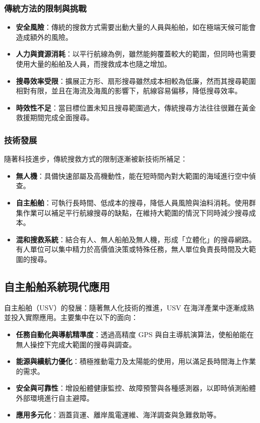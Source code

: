 \documentclass[12pt,a4paper]{ctexart}
\begin{document}
\subsubsection{傳統方法的限制與挑戰}
\begin{itemize}
  \item \textbf{安全風險}：傳統的搜救方式需要出動大量的人員與船舶，如在極端天候可能會造成額外的風險。
  \item \textbf{人力與資源消耗}：以平行航線為例，雖然能夠覆蓋較大的範圍，但同時也需要使用大量的船舶及人員，而搜救成本也隨之增加。
  \item \textbf{搜尋效率受限}：擴展正方形、扇形搜尋雖然成本相較為低廉，然而其搜尋範圍相對有限，並且在海流及海風的影響下，航線容易偏移，降低搜尋效率。
  \item \textbf{時效性不足}：當目標位置未知且搜尋範圍過大，傳統搜尋方法往往很難在黃金救援期間完成全面搜尋。
\end{itemize}

\subsubsection{技術發展}
隨著科技進步，傳統搜救方式的限制逐漸被新技術所補足：
\begin{itemize}
  \item \textbf{無人機}：具備快速部屬及高機動性，能在短時間內對大範圍的海域進行空中偵查。
  \item \textbf{自主船舶}：可執行長時間、低成本的搜尋，降低人員風險與油料消耗。使用群集作業可以補足平行航線搜尋的缺點，在維持大範圍的情況下同時減少搜尋成本。
  \item \textbf{混和搜救系統}：結合有人、無人船舶及無人機，形成「立體化」的搜尋網路。有人單位可以集中精力於高價值決策或特殊任務，無人單位負責長時間及大範圍的搜尋。
\end{itemize}

\subsection{自主船舶系統現代應用}
自主船舶（USV）的發展：隨著無人化技術的推進，USV 在海洋產業中逐漸成熟並投入實際應用。主要集中在以下的面向：
\begin{itemize}
  \item \textbf{任務自動化與導航精準度}：透過高精度 GPS 與自主導航演算法，使船舶能在無人操控下完成大範圍的搜尋與調查。
  \item \textbf{能源與續航力優化}：積極推動電力及太陽能的使用，用以滿足長時間海上作業的需求。
  \item \textbf{安全與可靠性}：增設船體健康監控、故障預警與各種感測器，以即時偵測船體外部環境進行自主避障。
  \item \textbf{應用多元化}：涵蓋貨運、離岸風電運維、海洋調查與急難救助等。
\end{itemize}
\end{document}
